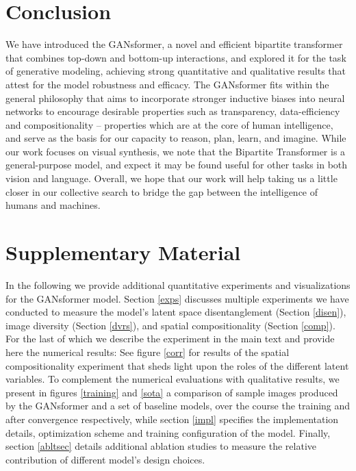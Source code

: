 \documentclass{article}
\begin{document}
 \section{Conclusion}
\label{conclusion}
We have introduced the GANsformer, a novel and efficient bipartite transformer that combines top-down and bottom-up interactions, and explored it for the task of generative modeling, achieving strong quantitative and qualitative results that attest for the model robustness and efficacy. The GANsformer fits within the general philosophy that aims to incorporate stronger inductive biases into neural networks to encourage desirable properties such as transparency, data-efficiency and compositionality -- properties which are at the core of human intelligence, and serve as the basis for our capacity to reason, plan, learn, and imagine. While our work focuses on visual synthesis, we note that the Bipartite Transformer is a general-purpose model, and expect it may be found useful for other tasks in both vision and language. Overall, we hope that our work will help taking us a little closer in our collective search to bridge the gap between the intelligence of humans and machines.


 




\cleardoublepage
\newpage

\appendix

\section*{Supplementary Material}

In the following we provide additional quantitative experiments and visualizations for the GANsformer model. Section \ref{exps} discusses multiple experiments we have conducted to measure the model's latent space disentanglement (Section \ref{disen}), image diversity (Section \ref{dvrs}), and spatial compositionality (Section \ref{comp}). For the last of which we describe the experiment in the main text and provide here the numerical results: See figure \ref{corr} for results of the spatial compositionality experiment that sheds light upon the roles of the different latent variables. To complement the numerical evaluations with qualitative results, we present in figures \ref{training} and \ref{sota} a comparison of sample images produced by the GANsformer and a set of baseline models, over the course the training and after convergence respectively, while section \ref{impl} specifies the implementation details, optimization scheme and training configuration of the model. Finally, section \ref{abltsec} details additional ablation studies to measure the relative contribution of different model's design choices. 
\end{document}

